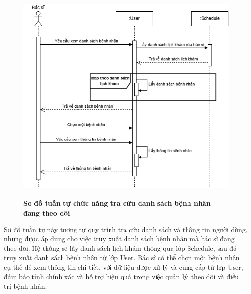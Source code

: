 \begin{figure}[H]
	\centering
	\includegraphics[width=12.8cm,height=11cm]{Images/sequence/user/getPatientByDoctor.drawio.png}
	\caption[Sơ đồ tuần tự chức năng tra cứu danh sách bệnh nhân đang theo dõi]{\bfseries \fontsize{12pt}{0pt}
		\selectfont Sơ đồ tuần tự chức năng tra cứu danh sách bệnh nhân đang theo dõi}
	\label{sequence_get_patient} %
\end{figure}
Sơ đồ tuần tự này tương tự quy trình tra cứu danh sách và thông tin người dùng, nhưng được áp dụng cho việc truy xuất danh sách bệnh nhân mà bác sĩ đang theo dõi.
Hệ thống sẽ lấy danh sách lịch khám thông qua lớp Schedule, sau đó truy xuất danh sách bệnh nhân từ lớp User. Bác sĩ có thể chọn một bệnh nhân cụ thể để xem thông tin chi tiết,
với dữ liệu được xử lý và cung cấp từ lớp User, đảm bảo tính chính xác và hỗ trợ hiệu quả trong việc quản lý, theo dõi và điều trị bệnh nhân.

